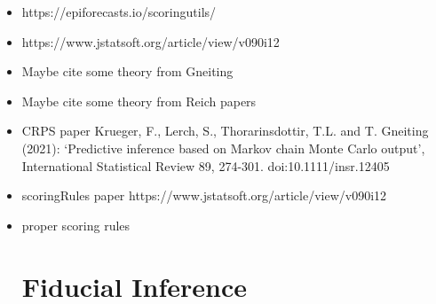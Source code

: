 \begin{itemize}
\item https://epiforecasts.io/scoringutils/
\item https://www.jstatsoft.org/article/view/v090i12
\item Maybe cite some theory from Gneiting
\item Maybe cite some theory from Reich papers 
\item CRPS paper Krueger, F., Lerch, S., Thorarinsdottir, T.L. and T. Gneiting (2021): ‘Predictive inference based on Markov chain Monte Carlo output’, International Statistical Review 89, 274-301. doi:10.1111/insr.12405
\item scoringRules paper https://www.jstatsoft.org/article/view/v090i12
\item proper scoring rules

\section{Fiducial Inference}

\end{itemize}

